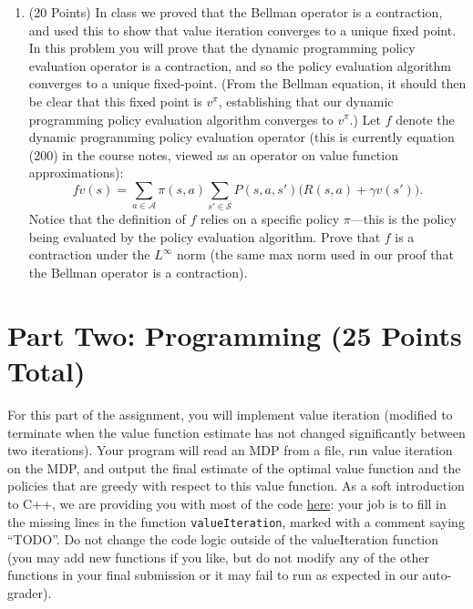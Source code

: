 \documentclass[]{article}
\begin{document}
\begin{enumerate}
    \item (20 Points) In class we proved that the Bellman operator is a contraction, and used this to show that value iteration converges to a unique fixed point. In this problem you will prove that the dynamic programming policy evaluation operator is a contraction, and so the policy evaluation algorithm converges to a unique fixed-point. (From the Bellman equation, it should then be clear that this fixed point is $v^\pi$, establishing that our dynamic programming policy evaluation algorithm converges to $v^\pi$.) Let $f$ denote the dynamic programming policy evaluation operator (this is currently equation (200) in the course notes, viewed as an operator on value function approximations):
    \begin{equation}
        fv(s) = \sum_{a \in \mathcal A} \pi(s,a) \sum_{s' \in \mathcal S} P(s,a,s')\big (R(s,a) + \gamma v(s')\big ).
    \end{equation}
    Notice that the definition of $f$ relies on a specific policy $\pi$---this is the policy being evaluated by the policy evaluation algorithm. 
    Prove that $f$ is a contraction under the $L^\infty$ norm (the same max norm used in our proof that the Bellman operator is a contraction).
\end{enumerate}

\section*{Part Two: Programming (25 Points Total)}

For this part of the assignment, you will implement value iteration (modified to terminate when the value function estimate has not changed significantly between two iterations). Your program will read an MDP from a file, run value iteration on the MDP, and output the final estimate of the optimal value function and the policies that are greedy with respect to this value function. As a soft introduction to C++, we are providing you with most of the code \href{https://people.cs.umass.edu/~pthomas/courses/CMPSCI_687_Fall2019/HW3Source.zip}{here}: your job is to fill in the missing lines in the function \texttt{valueIteration}, marked with a comment saying ``TODO''. Do not change the code logic outside of the valueIteration function (you may add new functions if you like, but do not modify any of the other functions in your final submission or it may fail to run as expected in our auto-grader).
\end{document}

